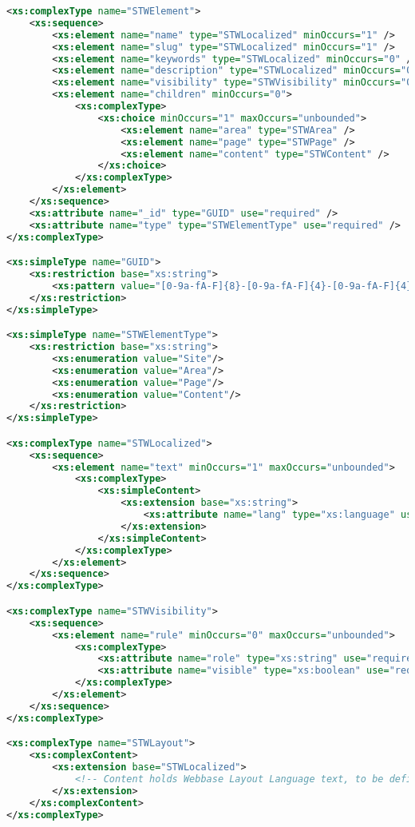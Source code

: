 \begin{lstlisting}[language=XML,caption={STWElement Base Type Definition}]
<xs:complexType name="STWElement">
    <xs:sequence>
        <xs:element name="name" type="STWLocalized" minOccurs="1" />
        <xs:element name="slug" type="STWLocalized" minOccurs="1" />
        <xs:element name="keywords" type="STWLocalized" minOccurs="0" />
        <xs:element name="description" type="STWLocalized" minOccurs="0" />
        <xs:element name="visibility" type="STWVisibility" minOccurs="0" />
        <xs:element name="children" minOccurs="0">
            <xs:complexType>
                <xs:choice minOccurs="1" maxOccurs="unbounded">
                    <xs:element name="area" type="STWArea" />
                    <xs:element name="page" type="STWPage" />
                    <xs:element name="content" type="STWContent" />
                </xs:choice>
            </xs:complexType>
        </xs:element>
    </xs:sequence>
    <xs:attribute name="_id" type="GUID" use="required" />
    <xs:attribute name="type" type="STWElementType" use="required" />
</xs:complexType>

<xs:simpleType name="GUID">
    <xs:restriction base="xs:string">
        <xs:pattern value="[0-9a-fA-F]{8}-[0-9a-fA-F]{4}-[0-9a-fA-F]{4}-[0-9a-fA-F]{4}-[0-9a-fA-F]{12}" />
    </xs:restriction>
</xs:simpleType>

<xs:simpleType name="STWElementType">
    <xs:restriction base="xs:string">
        <xs:enumeration value="Site"/>
        <xs:enumeration value="Area"/>
        <xs:enumeration value="Page"/>
        <xs:enumeration value="Content"/>
    </xs:restriction>
</xs:simpleType>

<xs:complexType name="STWLocalized">
    <xs:sequence>
        <xs:element name="text" minOccurs="1" maxOccurs="unbounded">
            <xs:complexType>
                <xs:simpleContent>
                    <xs:extension base="xs:string">
                        <xs:attribute name="lang" type="xs:language" use="required"/>
                    </xs:extension>
                </xs:simpleContent>
            </xs:complexType>
        </xs:element>
    </xs:sequence>
</xs:complexType>

<xs:complexType name="STWVisibility">
    <xs:sequence>
        <xs:element name="rule" minOccurs="0" maxOccurs="unbounded">
            <xs:complexType>
                <xs:attribute name="role" type="xs:string" use="required"/>
                <xs:attribute name="visible" type="xs:boolean" use="required"/>
            </xs:complexType>
        </xs:element>
    </xs:sequence>
</xs:complexType>

<xs:complexType name="STWLayout">
    <xs:complexContent>
        <xs:extension base="STWLocalized">
            <!-- Content holds Webbase Layout Language text, to be defined later. -->
        </xs:extension>
    </xs:complexContent>
</xs:complexType>
\end{lstlisting}


